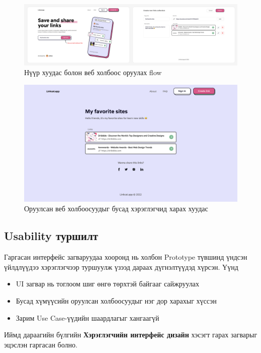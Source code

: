 \begin{figure}[h]
	\centering
	\includegraphics[width=15cm]{images/01-interface.png}
	\caption{Нүүр хуудас болон веб холбоос оруулах flow}
	\label{fig:interface1}
\end{figure}

\begin{figure}[h]
	\centering
	\includegraphics[width=15cm]{images/03-interface-page.png}
	\caption{Оруулсан веб холбоосуудыг бусад хэрэглэгчид харах хуудас}
	\label{fig:interface1}
\end{figure}
\pagebreak

\subsection{Usability туршилт}

Гаргасан интерфейс загваруудаа хооронд нь холбон Prototype түвшинд үндсэн үйлдлүүдээ хэрэглэгчээр туршуулж үзээд дараах дүгнэлтүүдэд хүрсэн. Үүнд

\begin{itemize}
	\item UI загвар нь тоглоом шиг өнгө төрхтэй байгааг сайжруулах
	\item Бусад хүмүүсийн оруулсан холбоосуудыг нэг дор харахыг хүссэн
	\item Зарим Use Case-үүдийн шаардлагыг хангаагүй
\end{itemize}

Иймд дараагийн бүлгийн \textbf{Хэрэглэгчийн интерфейс дизайн} хэсэгт гарах загварыг эцэслэн гаргасан болно.
